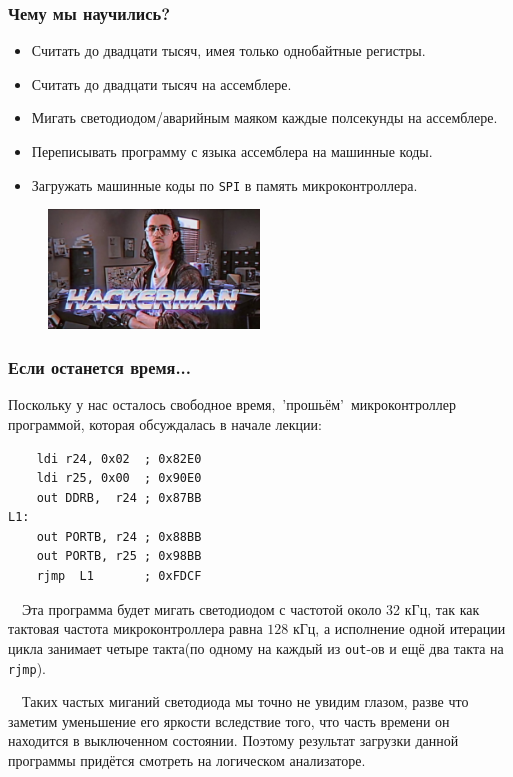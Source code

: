\documentclass[aspectratio=169, pdf, 8pt, unicode]{beamer}
\begin{document}
\begin{frame}[fragile]
\frametitle{Чему мы научились?}
	\begin{itemize}
		\item Считать до двадцати тысяч, имея только однобайтные регистры.
		\item Считать до двадцати тысяч на ассемблере.
		\item Мигать светодиодом/аварийным маяком каждые полсекунды на ассемблере.
		\item Переписывать программу с языка ассемблера на машинные коды.
		\item Загружать машинные коды по \texttt{SPI} в память микроконтроллера.
	\end{itemize}
	\begin{figure}[H]
		\centering
		\vspace*{-0.2cm}
		\includegraphics[width=0.5\textwidth]{resources/hacker.jpg}
	\end{figure}
\end{frame}

\begin{frame}[fragile]
\frametitle{Если останется время...}
	{ \large Поскольку у нас осталось свободное время,\ 'прошьём'\ микроконтроллер программой, которая обсуждалась в начале лекции: }
	\begin{lstlisting}
    ldi r24, 0x02  ; 0x82E0
    ldi r25, 0x00  ; 0x90E0
    out DDRB,  r24 ; 0x87BB
L1:
    out PORTB, r24 ; 0x88BB
    out PORTB, r25 ; 0x98BB
    rjmp  L1       ; 0xFDCF
	\end{lstlisting}
	\ \ Эта программа будет мигать светодиодом с частотой около 32 кГц, так как тактовая частота микроконтроллера равна $128$ кГц, а
	исполнение одной итерации цикла занимает четыре такта(по одному на каждый из \texttt{out}-ов и ещё два такта на \texttt{rjmp}).

	\ \ Таких частых миганий светодиода мы точно не увидим глазом, разве что заметим уменьшение его яркости вследствие того,
	что часть времени он находится в выключенном состоянии. Поэтому результат загрузки данной программы придётся смотреть на
	логическом анализаторе.
\end{frame}
\end{document}
